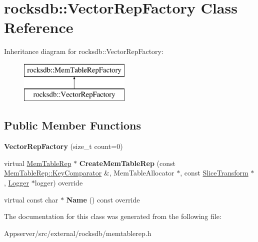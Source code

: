 \hypertarget{classrocksdb_1_1VectorRepFactory}{}\section{rocksdb\+:\+:Vector\+Rep\+Factory Class Reference}
\label{classrocksdb_1_1VectorRepFactory}
Inheritance diagram for rocksdb\+:\+:Vector\+Rep\+Factory\+:\begin{figure}[H]
\begin{center}
\leavevmode
\includegraphics[height=2.000000cm]{classrocksdb_1_1VectorRepFactory}
\end{center}
\end{figure}
\subsection*{Public Member Functions}
\begin{DoxyCompactItemize}
\item 
{\bfseries Vector\+Rep\+Factory} (size\+\_\+t count=0)\hypertarget{classrocksdb_1_1VectorRepFactory_a8b2e74ef4a114eb7c4e1398e455b7874}{}\label{classrocksdb_1_1VectorRepFactory_a8b2e74ef4a114eb7c4e1398e455b7874}

\item 
virtual \hyperlink{classrocksdb_1_1MemTableRep}{Mem\+Table\+Rep} $\ast$ {\bfseries Create\+Mem\+Table\+Rep} (const \hyperlink{classrocksdb_1_1MemTableRep_1_1KeyComparator}{Mem\+Table\+Rep\+::\+Key\+Comparator} \&, Mem\+Table\+Allocator $\ast$, const \hyperlink{classrocksdb_1_1SliceTransform}{Slice\+Transform} $\ast$, \hyperlink{classrocksdb_1_1Logger}{Logger} $\ast$logger) override\hypertarget{classrocksdb_1_1VectorRepFactory_ad406f739cd63d7e92d34c89b4e44f874}{}\label{classrocksdb_1_1VectorRepFactory_ad406f739cd63d7e92d34c89b4e44f874}

\item 
virtual const char $\ast$ {\bfseries Name} () const override\hypertarget{classrocksdb_1_1VectorRepFactory_ac1e1b8910a74d960405d70070d599f5c}{}\label{classrocksdb_1_1VectorRepFactory_ac1e1b8910a74d960405d70070d599f5c}

\end{DoxyCompactItemize}


The documentation for this class was generated from the following file\+:\begin{DoxyCompactItemize}
\item 
Appserver/src/external/rocksdb/memtablerep.\+h\end{DoxyCompactItemize}
